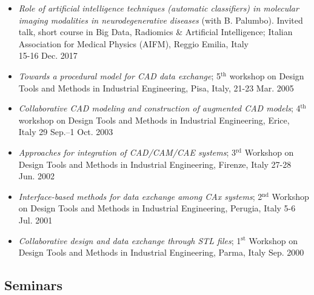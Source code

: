 \documentclass[11pt]{article}
\begin{document}
\begin{itemize}
\item \emph{Role of artificial intelligence techniques (automatic classifiers) in molecular imaging modalities in neurodegenerative diseases} (with B. Palumbo). Invited talk, short course in Big Data, Radiomics \& Artificial Intelligence; Italian Association for Medical Physics (AIFM), Reggio Emilia, Italy \\ \mbox{} \hfill 15-16 Dec. 2017
	\item \emph{Towards a procedural model for CAD data exchange}; 5$^\text{th}$ workshop on Design Tools and Methods in Industrial Engineering, Pisa, Italy, \hfill 21-23 Mar. 2005
	\item \emph{Collaborative CAD modeling and construction of augmented CAD models}; 4$^\text{th}$ workshop on Design Tools and Methods in Industrial Engineering, Erice, Italy \hfill 29 Sep.--1 Oct. 2003
	\item \emph{Approaches for integration of CAD/CAM/CAE systems}; 3$^\text{rd}$ Workshop on Design Tools and Methods in Industrial Engineering, Firenze, Italy \hfill 27-28 Jun. 2002
	\item \emph{Interface-based methods for data exchange among CAx systems}; 2$^\text{nd}$ Workshop on Design Tools and Methods in Industrial Engineering, Perugia, Italy \hfill 5-6 Jul. 2001
	\item \emph{Collaborative design and data exchange through STL files}; 1$^\text{st}$ Workshop on Design Tools and Methods in Industrial Engineering, Parma, Italy \hfill Sep. 2000
\end{itemize}

\subsection*{Seminars}
\end{document}

